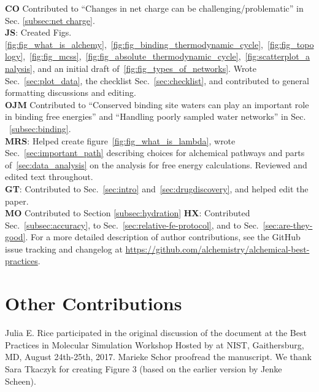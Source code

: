 \documentclass[9pt,bestpractices]{livecoms}
\newcommand{\githubrepository}{\url{https://github.com/alchemistry/alchemical-best-practices}} %
\begin{document}
\textbf{CO} Contributed to ``Changes in net charge can be challenging/problematic'' in Sec. \ref{subsec:net charge}. \\
\textbf{JS}: Created Figs.~ \ref{fig:fig_what_is_alchemy},~\ref{fig:fig_binding_thermodynamic_cycle},~\ref{fig:fig_topology},~\ref{fig:fig_mcss},~\ref{fig:fig_absolute_thermodynamic_cycle},~\ref{fig:scatterplot_analysis}, and an initial draft of~\ref{fig:fig_types_of_networks}. Wrote Sec.~\ref{sec:plot_data}, the checklist Sec.~\ref{sec:checklist}, and contributed to general formatting discussions and editing.\\
\textbf{OJM} Contributed to ``Conserved binding site waters can play an important role in binding free energies'' and ``Handling poorly sampled water networks'' in Sec. ~\ref{subsec:binding}.\\
\textbf{MRS}: Helped create figure~\ref{fig:fig_what_is_lambda}, wrote Sec.~\ref{sec:important_path} describing choices for alchemical pathways and parts of~\ref{sec:data_analysis} on the analysis for free energy calculations. Reviewed and edited text throughout.\\
\textbf{GT}: Contributed to Sec.~\ref{sec:intro} and~\ref{sec:drugdiscovery}, and helped edit the paper.\\
\textbf{MO} Contributed to Section \ref{subsec:hydration}
\textbf{HX}: Contributed Sec.~\ref{subsec:accuracy}, to Sec.~\ref{sec:relative-fe-protocol}, and to Sec.~\ref{sec:are-they-good}.
For a more detailed description of author contributions,
see the GitHub issue tracking and changelog at \githubrepository.

\section*{Other Contributions}
%
Julia E. Rice participated in the original discussion of the document at the Best Practices in Molecular Simulation Workshop Hosted by at NIST, Gaithersburg, MD, August 24th-25th, 2017.
Marieke Schor proofread the manuscript. 
We thank Sara Tkaczyk for creating Figure 3 (based on the earlier version by Jenke Scheen).
\end{document}
